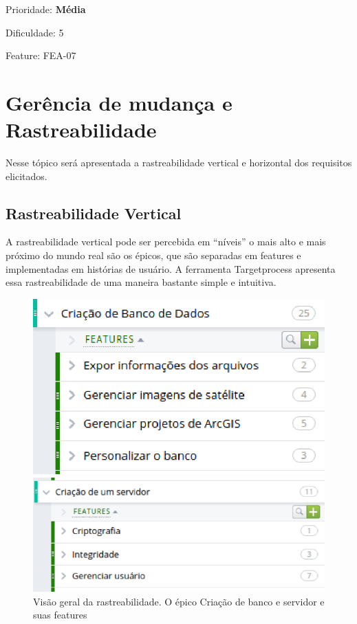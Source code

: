    Prioridade: \textbf{Média}

    Dificuldade: 5

    Feature: FEA-07

\section{Gerência de mudança e Rastreabilidade}

  Nesse tópico será apresentada a rastreabilidade vertical e horizontal dos requisitos elicitados.

\subsection{Rastreabilidade Vertical}

A rastreabilidade vertical pode ser percebida em “níveis” o mais alto e mais próximo do mundo real são os épicos, que são separadas em features e implementadas em histórias de usuário. A ferramenta Targetprocess apresenta essa rastreabilidade de uma maneira bastante simple e intuitiva.

  \begin{figure}[!htb]
    \begin{minipage}{7cm}
      \centering
      \includegraphics[scale=0.6]{figuras/rastreabilidade/vertical/epico_banco.eps}
    \end{minipage}\hspace{2cm}
    \begin{minipage}{7cm}
      \centering
      \includegraphics[scale=0.5]{figuras/rastreabilidade/vertical/epico_servidor.eps}
    \end{minipage}\hspace{2cm}
    \caption{Visão geral da rastreabilidade. O épico Criação de banco e servidor e suas features}
  \end{figure}

